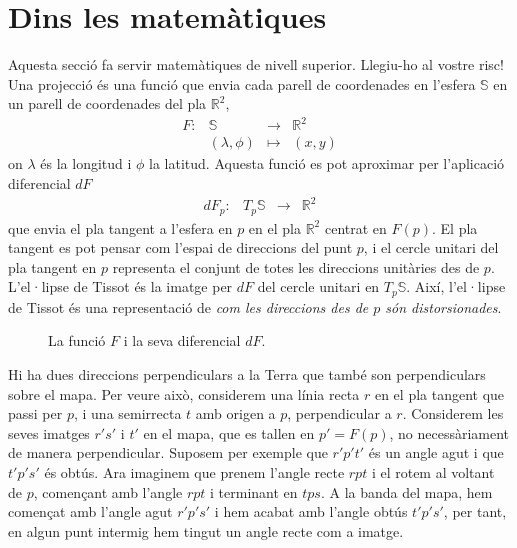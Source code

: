 \documentclass[a4paper,12pt]{article}
\begin{document}
\newpage
\section{Dins les matemàtiques}
\textsf{Aquesta secció fa servir matemàtiques de nivell superior. Llegiu-ho al vostre risc!} \\

Una projecció és una funció que envia cada parell de coordenades en l'esfera $\mathbb S$ en un parell de coordenades del pla $\mathbb R^2$,
$$\begin{array}{rccc}
   F: &\mathbb S & \longrightarrow & \mathbb R^2 \\
  & (\lambda, \phi) & \mapsto & (x,y)
  \end{array}
$$
on $\lambda$ és la longitud i $\phi$ la latitud. Aquesta funció es pot aproximar per l'aplicació diferencial $dF$
$$\begin{array}{rccc}
   dF_p: & T_p \mathbb S & \longrightarrow & \mathbb R^2 
  \end{array}
$$
que envia el pla tangent a l'esfera en $p$ en el pla $\mathbb R^2$ centrat en $F(p)$. El pla tangent es pot pensar com l'espai de direccions del punt $p$, i el cercle unitari del pla tangent en $p$ representa el conjunt de totes les direccions unitàries des de $p$. L'el·lipse de Tissot és la imatge per $dF$ del cercle unitari en $T_p\mathbb S$. Així, l'el·lipse de Tissot és una representació de \emph{com les direccions des de $p$ són distorsionades}.

\begin{figure}[h]
 \begin{center}
  \def\svgwidth{ 0.85 \textwidth}

\caption{La funció $F$ i la seva diferencial $dF$.}
 \end{center}
\end{figure}

Hi ha dues direccions perpendiculars a la Terra que també son perpendiculars sobre el mapa. Per veure això, considerem una línia recta $r$ en el pla tangent que passi per $p$, i una semirrecta $t$ amb origen a $p$, perpendicular a $r$. Considerem les seves imatges $r's'$ i $t'$ en el mapa, que es tallen en $p'=F(p)$, no necessàriament de manera perpendicular. Suposem per exemple que $r'p't'$ és un angle agut i que $t'p's'$ és obtús. Ara imaginem que prenem l'angle recte $rpt$ i el rotem al voltant de $p$, començant amb l'angle $rpt$ i terminant en $tps$. A la banda del mapa, hem començat amb l'angle agut $r'p's'$ i hem acabat amb l'angle obtús $t'p's'$, per tant, en algun punt intermig hem tingut un angle recte com a imatge.
\end{document}
